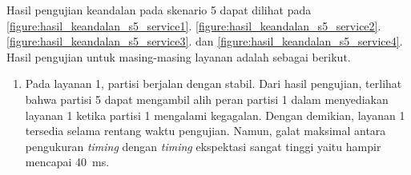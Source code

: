 \begin{enumerate}
		Hasil pengujian keandalan pada skenario 5 dapat dilihat pada
		\autoref{figure:hasil_keandalan_s5_service1}.
		\autoref{figure:hasil_keandalan_s5_service2}.
		\autoref{figure:hasil_keandalan_s5_service3}.  dan
		\autoref{figure:hasil_keandalan_s5_service4}.  Hasil pengujian untuk
		masing-masing layanan adalah sebagai berikut.
		
		\begin{enumerate}
			\item Pada layanan 1, partisi berjalan
				dengan stabil. Dari hasil pengujian, terlihat bahwa partisi 5 dapat mengambil
				alih peran partisi 1 dalam menyediakan layanan 1 ketika partisi 1 mengalami
				kegagalan. Dengan demikian, layanan 1 tersedia selama rentang waktu pengujian.
				Namun, galat maksimal antara pengukuran \textit{timing} dengan \textit{timing}
				ekspektasi sangat tinggi yaitu hampir mencapai \SI{40}{\milli\second}.


\end{enumerate}
\end{enumerate}
